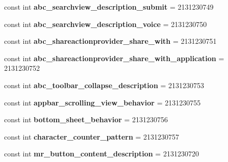 \begin{DoxyCompactItemize}
\mbox{\label{classXaria_1_1Resource_1_1String_a62f14b22bdc27b7e4945656a8f0e4496}} 
const int {\bfseries abc\+\_\+searchview\+\_\+description\+\_\+submit} = 2131230749
\item 
\mbox{\label{classXaria_1_1Resource_1_1String_a8511b2a846c3391d8ee6b4ae6df86c08}} 
const int {\bfseries abc\+\_\+searchview\+\_\+description\+\_\+voice} = 2131230750
\item 
\mbox{\label{classXaria_1_1Resource_1_1String_a7285e110462d9e10fa19133a81c6b2f1}} 
const int {\bfseries abc\+\_\+shareactionprovider\+\_\+share\+\_\+with} = 2131230751
\item 
\mbox{\label{classXaria_1_1Resource_1_1String_a54ffdeab9e17499f7afcf51af9a3d1a4}} 
const int {\bfseries abc\+\_\+shareactionprovider\+\_\+share\+\_\+with\+\_\+application} = 2131230752
\item 
\mbox{\label{classXaria_1_1Resource_1_1String_ab5083ddd392aa90b1a06e590542dacc9}} 
const int {\bfseries abc\+\_\+toolbar\+\_\+collapse\+\_\+description} = 2131230753
\item 
\mbox{\label{classXaria_1_1Resource_1_1String_ae7d0037506525009322145ddea6ad4a8}} 
const int {\bfseries appbar\+\_\+scrolling\+\_\+view\+\_\+behavior} = 2131230755
\item 
\mbox{\label{classXaria_1_1Resource_1_1String_af37061c783a45f1883cdb7051d9f9580}} 
const int {\bfseries bottom\+\_\+sheet\+\_\+behavior} = 2131230756
\item 
\mbox{\label{classXaria_1_1Resource_1_1String_af0961bbb4d81bb4e25fd29aa37c258f0}} 
const int {\bfseries character\+\_\+counter\+\_\+pattern} = 2131230757
\item 
\mbox{\label{classXaria_1_1Resource_1_1String_ab75bd788a7c9a28fc777af31278e3400}} 
const int {\bfseries mr\+\_\+button\+\_\+content\+\_\+description} = 2131230720
\item 

\end{DoxyCompactItemize}
